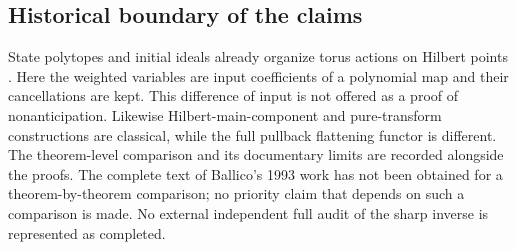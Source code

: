 \documentclass[11pt,reqno]{amsart}
\numberwithin{equation}{section}
\theoremstyle{definition}\newtheorem{definition}[theorem]{Definition}
\theoremstyle{remark}\newtheorem{remark}[theorem]{Remark}
\begin{document}
\subsection{Historical boundary of the claims}
State polytopes and initial ideals already organize torus actions
on Hilbert points \cite{BayerMorrison167}. Here the weighted
variables are input coefficients of a polynomial map and their
cancellations are kept. This difference of input is not offered
as a proof of nonanticipation. Likewise Hilbert-main-component
and pure-transform constructions are classical, while the full
pullback flattening functor is different. The theorem-level
comparison and its documentary limits are recorded alongside the
proofs. The complete text of Ballico's 1993 work has not been
obtained for a theorem-by-theorem comparison; no priority claim
that depends on such a comparison is made. No external independent
full audit of the sharp inverse is represented as completed.
\end{document}
